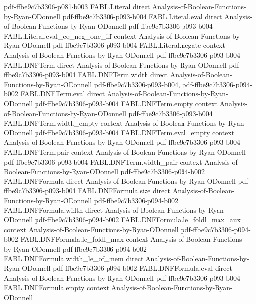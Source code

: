 \begin{theorem}
  {pdf-ffbe9c7b3306-p081-b003}
\proofstep
  {FABL.Literal}
  {direct}
  {Analysis-of-Boolean-Functions-by-Ryan-ODonnell}
  {pdf-ffbe9c7b3306-p093-b004}
\proofstep
  {FABL.Literal.eval}
  {direct}
  {Analysis-of-Boolean-Functions-by-Ryan-ODonnell}
  {pdf-ffbe9c7b3306-p093-b004}
\proofstep
  {FABL.Literal.eval_eq_neg_one_iff}
  {context}
  {Analysis-of-Boolean-Functions-by-Ryan-ODonnell}
  {pdf-ffbe9c7b3306-p093-b004}
\proofstep
  {FABL.Literal.negate}
  {context}
  {Analysis-of-Boolean-Functions-by-Ryan-ODonnell}
  {pdf-ffbe9c7b3306-p093-b004}
\proofstep
  {FABL.DNFTerm}
  {direct}
  {Analysis-of-Boolean-Functions-by-Ryan-ODonnell}
  {pdf-ffbe9c7b3306-p093-b004}
\proofstep
  {FABL.DNFTerm.width}
  {direct}
  {Analysis-of-Boolean-Functions-by-Ryan-ODonnell}
  {pdf-ffbe9c7b3306-p093-b004,
    pdf-ffbe9c7b3306-p094-b002}
\proofstep
  {FABL.DNFTerm.eval}
  {direct}
  {Analysis-of-Boolean-Functions-by-Ryan-ODonnell}
  {pdf-ffbe9c7b3306-p093-b004}
\proofstep
  {FABL.DNFTerm.empty}
  {context}
  {Analysis-of-Boolean-Functions-by-Ryan-ODonnell}
  {pdf-ffbe9c7b3306-p093-b004}
\proofstep
  {FABL.DNFTerm.width_empty}
  {context}
  {Analysis-of-Boolean-Functions-by-Ryan-ODonnell}
  {pdf-ffbe9c7b3306-p093-b004}
\proofstep
  {FABL.DNFTerm.eval_empty}
  {context}
  {Analysis-of-Boolean-Functions-by-Ryan-ODonnell}
  {pdf-ffbe9c7b3306-p093-b004}
\proofstep
  {FABL.DNFTerm.pair}
  {context}
  {Analysis-of-Boolean-Functions-by-Ryan-ODonnell}
  {pdf-ffbe9c7b3306-p093-b004}
\proofstep
  {FABL.DNFTerm.width_pair}
  {context}
  {Analysis-of-Boolean-Functions-by-Ryan-ODonnell}
  {pdf-ffbe9c7b3306-p094-b002}
\proofstep
  {FABL.DNFFormula}
  {direct}
  {Analysis-of-Boolean-Functions-by-Ryan-ODonnell}
  {pdf-ffbe9c7b3306-p093-b004}
\proofstep
  {FABL.DNFFormula.size}
  {direct}
  {Analysis-of-Boolean-Functions-by-Ryan-ODonnell}
  {pdf-ffbe9c7b3306-p094-b002}
\proofstep
  {FABL.DNFFormula.width}
  {direct}
  {Analysis-of-Boolean-Functions-by-Ryan-ODonnell}
  {pdf-ffbe9c7b3306-p094-b002}
\proofstep
  {FABL.DNFFormula.le_foldl_max_aux}
  {context}
  {Analysis-of-Boolean-Functions-by-Ryan-ODonnell}
  {pdf-ffbe9c7b3306-p094-b002}
\proofstep
  {FABL.DNFFormula.le_foldl_max}
  {context}
  {Analysis-of-Boolean-Functions-by-Ryan-ODonnell}
  {pdf-ffbe9c7b3306-p094-b002}
\proofstep
  {FABL.DNFFormula.width_le_of_mem}
  {direct}
  {Analysis-of-Boolean-Functions-by-Ryan-ODonnell}
  {pdf-ffbe9c7b3306-p094-b002}
\proofstep
  {FABL.DNFFormula.eval}
  {direct}
  {Analysis-of-Boolean-Functions-by-Ryan-ODonnell}
  {pdf-ffbe9c7b3306-p093-b004}
\proofstep
  {FABL.DNFFormula.empty}
  {context}
  {Analysis-of-Boolean-Functions-by-Ryan-ODonnell}

\end{theorem}
